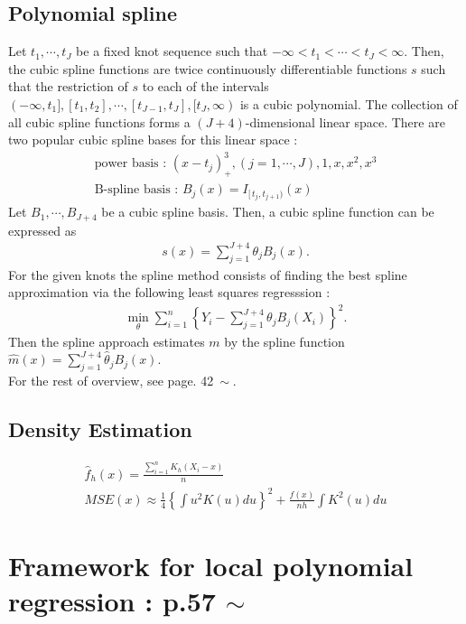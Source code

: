 \documentclass[12pt]{article}
\renewcommand{\=}[1]{\stackrel{#1}{=}} %
\theoremstyle{definition}
\begin{document}
\subsection{Polynomial spline}
	Let $t_1,\cdots,t_J$ be a fixed knot sequence such that $-\infty<t_1<\cdots<t_J<\infty$. Then, the cubic spline functions are twice continuously differentiable functions $s$ such that the restriction of $s$ to each of the intervals $(-\infty,t_1],[t_1,t_2],\cdots,[t_{J-1},t_J],[t_J,\infty)$ is a cubic polynomial. The collection of all cubic spline functions forms a $(J+4)$-dimensional linear space. There are two popular cubic spline bases for this linear space :
	\begin{align}
	\text{power basis : }(x-t_j)^3_+,(j=1,\cdots,J),1,x,x^2,x^3\\
	\text{B-spline basis : }B_j(x)=I_{[\,t_j,t_{j+1})}(x)
	\end{align}
	Let $B_1,\cdots,B_{J+4}$ be a cubic spline basis. Then, a cubic spline function can be expressed as
	\begin{align}
	s(x)=\sum_{j=1}^{J+4}\theta_jB_j(x).
	\end{align}
	For the given knots the spline method consists of finding the best spline approximation via the following least squares regresssion :
	\begin{align}
	\underset{\theta}{\min}\sum_{i=1}^n\left\{Y_i-\sum_{j=1}^{J+4}\theta_jB_j(X_i)\right\}^2.
	\end{align}
	Then the spline approach estimates $m$ by the spline function $\hat{m}(x)=\sum_{j=1}^{J+4}\hat{\theta}_jB_j(x)$.\\
	For the rest of overview, see page. 42$~\sim$.

\subsection{Density Estimation}
	\begin{align}
	\hat{f}_h(x)=\frac{\sum_{i=1}^nK_h(X_i-x)}{n}\\
	MSE(x)\approx\frac{1}{4}\left\{\int u^2K(u)du\right\}^2+\frac{f(x)}{nh}\int K^2(u)du
	\end{align}

\section{Framework for local polynomial regression : p.57 $\sim$}
\end{document}
